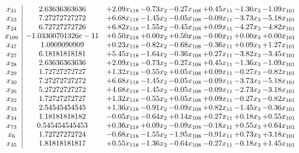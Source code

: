 \documentclass[8pt]{article}
\begin{document}
\[\begin{array}{c| c c@{\hskip 2pt} c@{\hskip 2pt} c@{\hskip 2pt} c@{\hskip 2pt} c@{\hskip 2pt} c@{\hskip 2pt} }
 x_{21}   &  2.63636363636 & +  2.09 x_{118} & -0.73 x_{2} & -0.27 x_{108} & +  0.45 x_{11} & -1.36 x_{3} & -1.09 x_{101}\\
 x_{23}   &  7.27272727272 & +  6.68 x_{118} & -1.45 x_{2} & -0.05 x_{108} & -0.09 x_{11} & -3.73 x_{3} & -5.18 x_{101}\\
 x_{24}   &  6.72727272726 & +  6.82 x_{118} & -1.55 x_{2} & -0.45 x_{108} & +  0.09 x_{11} & -4.27 x_{3} & -4.82 x_{101}\\
 x_{109}   &  -1.03300701326e-11 & +  0.50 x_{118} & +  0.00 x_{2} & +  0.50 x_{108} & -0.00 x_{11} & +  0.00 x_{3} & +  0.00 x_{101}\\
 x_{47}   &  1.0909090909 & +  0.23 x_{118} & -0.82 x_{2} & -0.68 x_{108} & -0.36 x_{11} & +  0.09 x_{3} & +  1.27 x_{101}\\
 x_{27}   &  6.18181818181 & +  5.45 x_{118} & -1.64 x_{2} & -0.36 x_{108} & +  0.27 x_{11} & -3.82 x_{3} & -3.45 x_{101}\\
 x_{28}   &  2.63636363636 & +  2.09 x_{118} & -0.73 x_{2} & -0.27 x_{108} & +  0.45 x_{11} & -1.36 x_{3} & -1.09 x_{101}\\
 x_{29}   &  1.72727272727 & +  1.32 x_{118} & -0.55 x_{2} & +  0.05 x_{108} & +  0.09 x_{11} & -0.27 x_{3} & -0.82 x_{101}\\
 x_{30}   &  7.27272727272 & +  6.68 x_{118} & -1.45 x_{2} & -0.05 x_{108} & -0.09 x_{11} & -3.73 x_{3} & -5.18 x_{101}\\
 x_{26}   &  5.27272727272 & +  4.68 x_{118} & -1.45 x_{2} & -0.05 x_{108} & -0.09 x_{11} & -2.73 x_{3} & -3.18 x_{101}\\
 x_{32}   &  1.72727272727 & +  1.32 x_{118} & -0.55 x_{2} & +  0.05 x_{108} & +  0.09 x_{11} & -0.27 x_{3} & -0.82 x_{101}\\
 x_{33}   &  2.54545454545 & +  1.36 x_{118} & -0.91 x_{2} & -0.09 x_{108} & +  0.82 x_{11} & -1.45 x_{3} & -0.36 x_{101}\\
 x_{34}   &  1.18181818182 & -0.05 x_{118} & -0.64 x_{2} & +  0.14 x_{108} & +  0.27 x_{11} & +  0.18 x_{3} & +  0.55 x_{101}\\
 x_{73}   &  0.545454545453 & +  0.36 x_{118} & +  0.09 x_{2} & -0.09 x_{108} & -0.18 x_{11} & +  0.55 x_{3} & +  0.64 x_{101}\\
 x_{6}   &  1.72727272724 & -0.68 x_{118} & -1.55 x_{2} & -1.95 x_{108} & -0.91 x_{11} & +  0.73 x_{3} & +  3.18 x_{101}\\
 x_{35}   &  1.81818181817 & +  0.55 x_{118} & -1.36 x_{2} & -0.64 x_{108} & -0.27 x_{11} & -0.18 x_{3} & +  1.45 x_{101}\\

\end{array}\]
\end{document}
